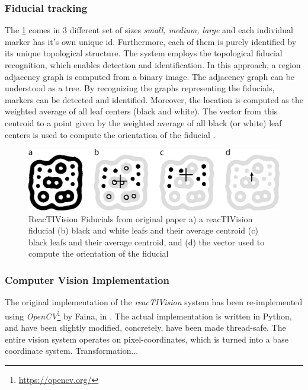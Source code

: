 \subsubsection{Fiducial tracking}

The  \ref{fig:fiducial_markers} comes in 3 different set of sizes \emph{small, medium, large} and each individual marker has it's own unique id. Furthermore, each of them is purely identified by its unique topological structure. The system employs the topological fiducial recognition, which enables detection and identification. In this approach, a region adjacency graph is computed from a binary image. The adjacency graph can be understood as a tree. By recognizing the graphs representing the fiducials, markers can be detected and identified. Moreover, the location is computed as the weighted average of all leaf centers (black and white). The vector from this centroid to a point given by the weighted average of all black (or white) leaf centers is used to compute the orientation of the fiducial \citep{bencina2005improved}.

\begin{figure}[H]
  \centering
  \includegraphics[width=0.66\linewidth]{include/images/fiducial_markers.PNG}
  \caption{ReacTIVision Fiducials from original paper a) a reacTIVision fiducial (b) black and white leafs and their average centroid (c) black leafs and their average centroid, and (d) the vector used to compute the orientation of the fiducial}
  \label{fig:fiducial_markers}
\end{figure}

\subsubsection{Computer Vision Implementation}

The original implementation of the \emph{reacTIVision} system has been re-implemented using \emph{OpenCV}\footnote{\url{https://opencv.org/}} by Faina, in \citep{faina2017automating}. The actual implementation is written in Python, and have been slightly modified, concretely, have been made thread-safe. The entire vision system operates on pixel-coordinates, which is turned into a base coordinate system. Transformation...

